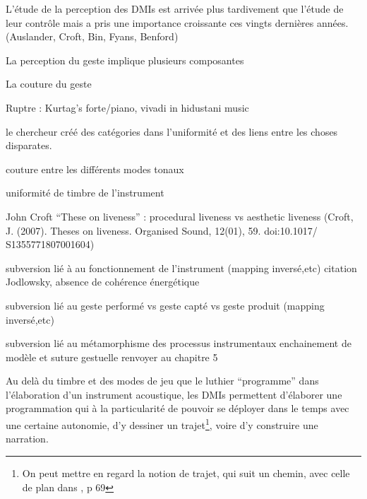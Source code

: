 L'étude de la perception des \glspl{DMI} est arrivée plus tardivement que l'étude de leur contrôle mais a pris une importance croissante ces vingts dernières années. (Auslander, Croft, Bin, Fyans, Benford)


La perception du geste implique plusieurs composantes 

La couture du geste

Ruptre : Kurtag's forte/piano, vivadi in hidustani music

le chercheur créé des catégories dans l'uniformité et des liens entre les choses disparates.

couture entre les différents modes tonaux

uniformité de timbre de l'instrument

John Croft ``These on liveness''  : procedural liveness vs aesthetic liveness (Croft, J. (2007). Theses on liveness. Organised Sound, 12(01), 59. doi:10.1017/
S1355771807001604)




subversion lié à au fonctionnement de l'instrument (mapping inversé,etc)
	citation Jodlowsky, absence de cohérence énergétique

subversion lié au geste performé vs geste capté vs geste produit
	(mapping inversé,etc)


subversion lié au métamorphisme des processus instrumentaux
	enchainement de modèle et suture gestuelle
	renvoyer au chapitre 5


\indent Au delà du timbre et des modes de jeu que le luthier ``programme'' dans l'élaboration d'un instrument acoustique, les \glspl{DMI} permettent d'élaborer une programmation qui à la particularité de pouvoir se déployer dans le temps avec une certaine autonomie, d'y dessiner un trajet\footnote{On peut mettre en regard la notion de trajet, qui suit un chemin, avec celle de plan    dans \cite{leroi-gourhan_geste_1964}, p 69}, voire d'y construire une narration. 